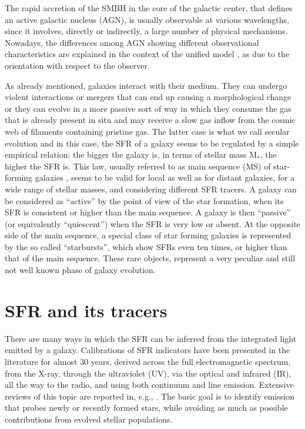 The rapid accretion of the SMBH in the core of the galactic center, that defines an active galactic nucleus (AGN), is usually observable at various wavelengths, since it involves, directly or indirectly, a large number of physical mechanisms. Nowadays, the differences among AGN showing different observational characteristics are explained in the context of the unified model \citep{1977ApJ...213..635R, 1984ApJ...278..499A, 1985ApJ...297..621A, 1993ARA&A..31..473A, 1995PASP..107..803U, 2015ARA&A..53..365N}, as due to the orientation with respect to the observer.

As already mentioned, galaxies interact with their medium. They can undergo violent interactions or mergers that can end up causing a morphological change or they can evolve in a more passive sort of way in which they consume the gas that is already present in situ and may receive a slow gas inflow from the cosmic web of filaments containing pristine gas. The latter case is what we call secular evolution and in this case, the SFR of a galaxy
seems to be regulated by a simple empirical relation: the bigger the galaxy is, in terms of stellar mass M$_*$, the higher the SFR is. This law, usually referred to as main sequence (MS) of star-forming galaxies \citep{2004MNRAS.351.1151B, 2007A&A...468...33E, 2007ApJ...670..156D, 2007ApJ...660L..47N, 2014MNRAS.443...19R, 2017MNRAS.465.3390A}, seems to be valid for local as well as for distant galaxies, for a wide range of stellar masses, and considering different SFR tracers. A galaxy can be considered as ``active'' by the point of view of the star formation, when its SFR is consistent or higher than the main sequence. A galaxy is then ``passive'' (or equivalently ``quiescent'') when the SFR is very low or absent. At the opposite side of the main sequence, a special class of star forming galaxies is represented by the so called ``starbursts'', which show SFRs even ten times, or higher than that of the main sequence. These rare objects, represent a very peculiar and still not well known phase of galaxy evolution. 

\section{SFR and its tracers}%

There are many ways in which the SFR can be inferred from the integrated light emitted by a galaxy. Calibrations of SFR indicators have been presented in the literature for almost 30 years, derived across the full electromagnetic spectrum, from the X-ray, through the ultraviolet (UV), via the optical and infrared (IR), all the way to the radio, and using both continuum and line emission. Extensive reviews of this topic are reported in, e.g., \citet{1998ARA&A..36..189K,2012ARA&A..50..531K,2012MNRAS.420.2190V}. The basic goal is to identify emission that probes newly or recently formed stars, while avoiding as much as possible contributions from evolved stellar populations.

